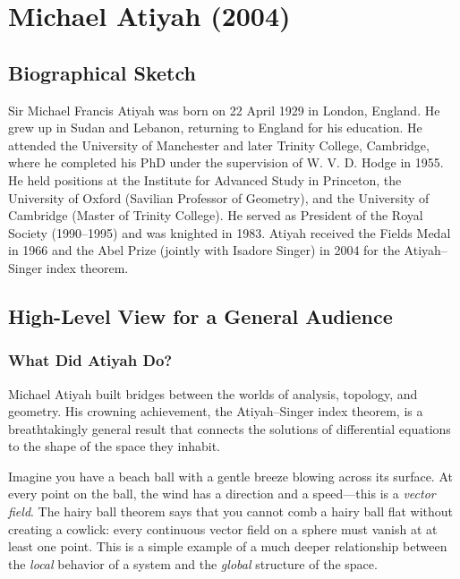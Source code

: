 \chapter{Michael Atiyah (2004)}

\section{Biographical Sketch}

Sir Michael Francis Atiyah was born on 22 April 1929 in London, England. He grew up in Sudan and Lebanon, returning to England for his education. He attended the University of Manchester and later Trinity College, Cambridge, where he completed his PhD under the supervision of W. V. D. Hodge in 1955. He held positions at the Institute for Advanced Study in Princeton, the University of Oxford (Savilian Professor of Geometry), and the University of Cambridge (Master of Trinity College). He served as President of the Royal Society (1990--1995) and was knighted in 1983. Atiyah received the Fields Medal in 1966 and the Abel Prize (jointly with Isadore Singer) in 2004 for the Atiyah--Singer index theorem.

\section{High-Level View for a General Audience}

\subsection{What Did Atiyah Do?}

Michael Atiyah built bridges between the worlds of analysis, topology, and geometry. His crowning achievement, the Atiyah--Singer index theorem, is a breathtakingly general result that connects the solutions of differential equations to the shape of the space they inhabit.

Imagine you have a beach ball with a gentle breeze blowing across its surface. At every point on the ball, the wind has a direction and a speed---this is a \emph{vector field}. The hairy ball theorem says that you cannot comb a hairy ball flat without creating a cowlick: every continuous vector field on a sphere must vanish at at least one point. This is a simple example of a much deeper relationship between the \emph{local} behavior of a system and the \emph{global} structure of the space.

